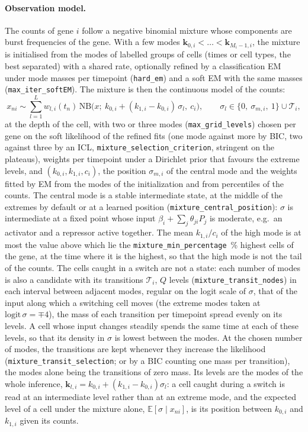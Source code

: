 \documentclass[a4paper, 11pt]{article}
\newcommand{\E}{\mathbb{E}}
\theoremstyle{plain}
\theoremstyle{remark}
\begin{document}
\paragraph{Observation model.} The counts of gene $i$ follow a negative binomial mixture whose components are burst frequencies of the gene. With a few modes $\mathbf{k}_{0,i} < \dots < \mathbf{k}_{M_i-1,i}$, the mixture is initialised from the modes of labelled groups of cells (times or cell types, the best separated) with a shared rate, optionally refined by a classification EM under mode masses per timepoint (\texttt{hard\_em}) and a soft EM with the same masses (\texttt{max\_iter\_softEM}). The mixture is then the continuous model of the counts:
\begin{equation}\label{eq:grid}
x_{ni} \sim \sum_{l=1}^{L} w_{l,i}(t_n)\,\mathrm{NB}\bigl(x;\ k_{0,i} + (k_{1,i} - k_{0,i})\,\sigma_l,\ c_i\bigr), \qquad \sigma_l \in \{0,\ \sigma_{m,i},\ 1\} \cup \mathcal{T}_i,
\end{equation}
at the depth of the cell, with two or three modes (\texttt{max\_grid\_levels}) chosen per gene on the soft likelihood of the refined fits (one mode against more by BIC, two against three by an ICL, \texttt{mixture\_selection\_criterion}, stringent on the plateaus), weights per timepoint under a Dirichlet prior that favours the extreme levels, and $(k_{0,i}, k_{1,i}, c_i)$, the position $\sigma_{m,i}$ of the central mode and the weights fitted by EM from the modes of the initialization and from percentiles of the counts. The central mode is a stable intermediate state, at the middle of the extremes by default or at a learned position (\texttt{mixture\_central\_position}): $\sigma$ is intermediate at a fixed point whose input $\beta_i + \sum_j \theta_{ji} P_j$ is moderate, e.g.\ an activator and a repressor active together. The mean $k_{1,i}/c_i$ of the high mode is at most the value above which lie the \texttt{mixture\_min\_percentage}~\% highest cells of the gene, at the time where it is the highest, so that the high mode is not the tail of the counts. The cells caught in a switch are not a state: each number of modes is also a candidate with its transitions $\mathcal{T}_i$, $Q$ levels (\texttt{mixture\_transit\_nodes}) in each interval between adjacent modes, regular on the logit scale of $\sigma$, that of the input along which a switching cell moves (the extreme modes taken at $\mathrm{logit}\,\sigma = \mp 4$), the mass of each transition per timepoint spread evenly on its levels. A cell whose input changes steadily spends the same time at each of these levels, so that its density in $\sigma$ is lowest between the modes. At the chosen number of modes, the transitions are kept whenever they increase the likelihood (\texttt{mixture\_transit\_selection}; or by a BIC counting one mass per transition), the modes alone being the transitions of zero mass. Its levels are the modes of the whole inference, $\mathbf{k}_{l,i} = k_{0,i} + (k_{1,i} - k_{0,i})\sigma_l$: a cell caught during a switch is read at an intermediate level rather than at an extreme mode, and the expected level of a cell under the mixture alone, $\E[\sigma \mid x_{ni}]$, is its position between $k_{0,i}$ and $k_{1,i}$ given its counts.
\end{document}
